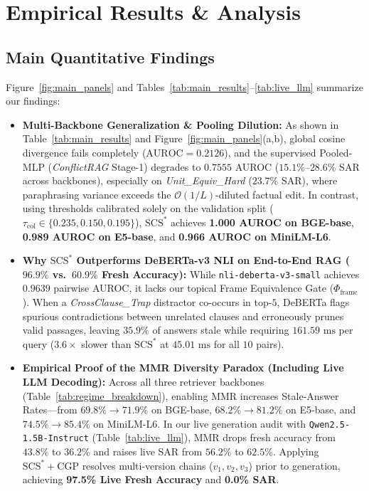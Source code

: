 \documentclass[11pt,a4paper]{article}
\theoremstyle{definition}
\newcommand{\SCS}{\mathrm{SCS}^*}
\begin{document}
\section{Empirical Results \& Analysis}
\subsection{Main Quantitative Findings}
Figure~\ref{fig:main_panels} and Tables~\ref{tab:main_results}--\ref{tab:live_llm} summarize our findings:
\begin{itemize}
    \item \textbf{Multi-Backbone Generalization \& Pooling Dilution:} As shown in Table~\ref{tab:main_results} and Figure~\ref{fig:main_panels}(a,b), global cosine divergence fails completely ($\mathrm{AUROC} = 0.2126$), and the supervised Pooled-MLP (\emph{ConflictRAG} Stage-1) degrades to $0.7555$ AUROC ($15.1\%$--$28.6\%$ SAR across backbones), especially on \emph{Unit\_Equiv\_Hard} ($23.7\%$ SAR), where paraphrasing variance exceeds the $\mathcal{O}(1/L)$-diluted factual edit. In contrast, using thresholds calibrated solely on the validation split ($\tau_{\mathrm{col}} \in \{0.235, 0.150, 0.195\}$), $\SCS$ achieves \textbf{1.000 AUROC on BGE-base}, \textbf{0.989 AUROC on E5-base}, and \textbf{0.966 AUROC on MiniLM-L6}.
    \item \textbf{Why $\SCS$ Outperforms DeBERTa-v3 NLI on End-to-End RAG ($96.9\%$ vs.\ $60.9\%$ Fresh Accuracy):} While \texttt{nli-deberta-v3-small} achieves $0.9639$ pairwise AUROC, it lacks our topical Frame Equivalence Gate ($\Phi_{\mathrm{frame}}$). When a \emph{CrossClause\_Trap} distractor co-occurs in top-$5$, DeBERTa flags spurious contradictions between unrelated clauses and erroneously prunes valid passages, leaving $35.9\%$ of answers stale while requiring $161.59\text{ ms}$ per query ($3.6\times$ slower than $\SCS$ at $45.01\text{ ms}$ for all $10$ pairs).
    \item \textbf{Empirical Proof of the MMR Diversity Paradox (Including Live LLM Decoding):} Across all three retriever backbones (Table~\ref{tab:regime_breakdown}), enabling MMR increases Stale-Answer Rates---from $69.8\% \to 71.9\%$ on BGE-base, $68.2\% \to 81.2\%$ on E5-base, and $74.5\% \to 85.4\%$ on MiniLM-L6. In our live generation audit with \texttt{Qwen2.5-1.5B-Instruct} (Table~\ref{tab:live_llm}), MMR drops fresh accuracy from $43.8\%$ to $36.2\%$ and raises live SAR from $56.2\%$ to $62.5\%$. Applying $\SCS+\mathrm{CGP}$ resolves multi-version chains ($v_1, v_2, v_3$) prior to generation, achieving \textbf{97.5\% Live Fresh Accuracy} and \textbf{0.0\% SAR}.
\end{itemize}
\end{document}
